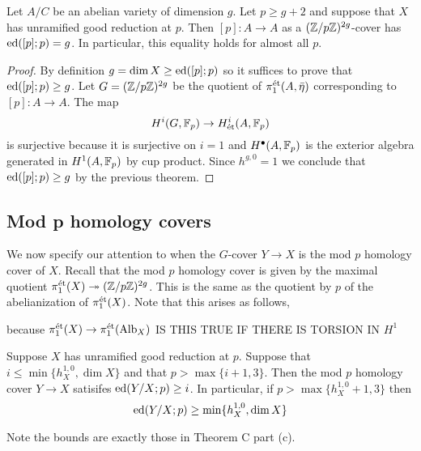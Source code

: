 \documentclass[12pt]{article}
\begin{document}
\begin{cor}
Let $A/C$ be an abelian variety of dimension $g$. Let $p \ge g + 2$ and suppose that $X$ has unramified good reduction at $p$. Then $[p] : A \to A$ as a $(\mathbb{Z} / p \mathbb{Z})^{2g}$-cover has $\mathrm{ed}([p] ; p) = g$. In particular, this equality holds for almost all $p$.
\end{cor}

\begin{proof}
By definition $g = \dim{X} \ge \mathrm{ed}([p] ; p)$ so it suffices to prove that $\mathrm{ed}([p] ; p) \ge g$. Let $G = (\mathbb{Z} / p \mathbb{Z})^{2g}$ be the quotient of $\pi_1^{\text{\'{e}t}}(A, \bar{\eta})$ corresponding to $[p] : A \to A$. The map
\[ H^i(G, \mathbb{F}_p) \to H^i_{\text{\'{e}t}}(A, \mathbb{F}_p) \]
is surjective because it is surjective on $i = 1$ and $H^\bullet(A, \mathbb{F}_p)$ is the exterior algebra generated in $H^1(A, \mathbb{F}_p)$ by cup product. Since $h^{g, 0} = 1$ we conclude that $\mathrm{ed}([p] ; p) \ge g$ by the previous theorem. 
\end{proof}

\subsection{Mod p homology covers}

We now specify our attention to when the $G$-cover $Y \to X$ is the mod $p$ homology cover of $X$. Recall that the mod $p$ homology cover is given by the maximal quotient $\pi_1^{\text{\'{e}t}}(X) \twoheadrightarrow (\mathbb{Z} / p \mathbb{Z})^{2g}$. This is the same as the quotient by $p$ of the abelianization of $\pi_1^{\text{\'{e}t}}(X)$. Note that this arises as follows,
\begin{center}
\end{center}
because $\pi_1^{\text{\'{e}t}}(X) \to \pi_1^{\text{\'{e}t}}(\mathrm{Alb}_X)$ {\color{red} IS THIS TRUE IF THERE IS TORSION IN $H^1$}

\begin{theorem}[E]
Suppose $X$ has unramified good reduction at $p$. Suppose that $i \le \min\{ h^{1,0}_X, \dim{X} \}$ and that $p > \max\{ i + 1, 3 \}$. Then the mod $p$ homology cover $Y \to X$ satisifes $\mathrm{ed}(Y/X ; p) \ge i$. In particular, if $p > \max\{ h^{1,0}_X + 1, 3 \}$ then
\[ \mathrm{ed}(Y/X ; p) \ge \min\{h^{1,0}_X, \dim{X}\} \]
\end{theorem}

\begin{rmk}
Note the bounds are exactly those in Theorem C part (c).
\end{rmk}
\end{document}
